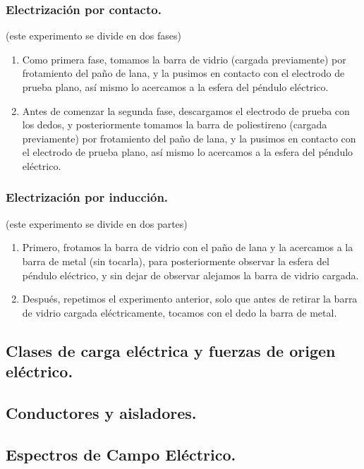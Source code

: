 \documentclass[spanish,10pt,a4paper,onecolumn]{article}
\begin{document}
\subsubsection{Electrización por contacto.} 
(este experimento se divide en dos fases) 
\begin{enumerate}
	\item Como primera fase, tomamos la barra de vidrio (cargada previamente) por frotamiento del paño de lana, y la pusimos en contacto con el electrodo de prueba plano, así mismo lo acercamos a la esfera del péndulo eléctrico. 
	\item Antes de comenzar la segunda fase, descargamos el electrodo de prueba con los dedos, y posteriormente tomamos la barra de poliestireno (cargada previamente) por frotamiento del paño de lana, y la pusimos en contacto con el electrodo de prueba plano, así mismo lo acercamos a la esfera del péndulo eléctrico.  
\end{enumerate}
\subsubsection{Electrización por inducción. }
(este experimento se divide en dos partes) 
\begin{enumerate}
	\item Primero, frotamos la barra de vidrio con el paño de lana y la acercamos a la barra de metal (sin tocarla), para posteriormente observar la esfera del péndulo eléctrico, y sin dejar de observar alejamos la barra de vidrio cargada.
	\item Después, repetimos el experimento anterior, solo que antes de retirar la barra de vidrio cargada eléctricamente, tocamos con el dedo la barra de metal. 
\end{enumerate}

\subsection{Clases de carga eléctrica y fuerzas de origen eléctrico.}

\subsection{Conductores y aisladores.}


\subsection{ Espectros de Campo Eléctrico.}
\end{document}
